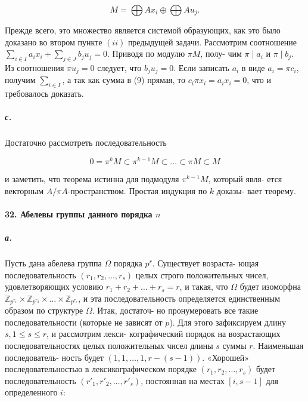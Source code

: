 {\begin{equation*}
M = \bigoplus Ax_{i} \oplus \bigoplus Au_{j}.
\end{equation*}




\noindent Прежде всего, это множество является системой образующих, как это
было доказано во втором пункте $(ii)$ предыдущей задачи. Рассмотрим
соотношение $\sum_{i \in I}a_{i}x_{i} + \sum_{j \in J}b_{j}u_{j} = 0$. Приводя по модулю $\pi M$, полу-
чим $\pi\;|\;a_{i}$ и $\pi\;|\;b_{j}$. Из соотношения $\pi u_{j} = 0$ следует, что $b_{j}u_{j} = 0$. Если
записать $a_{i}$ в виде $a_{i} = \pi c_{i}$, получим $\sum_{i \in I}$, а так как сумма
в (9) прямая, то $c_{i}\pi x_{i} = a_{i}x_{i} = 0$, что и требовалось доказать.

\subparagraph{с.} Достаточно рассмотреть последовательность

\begin{equation*}
0 = \pi^{k}M \subset \pi^{k-1}M \subset\dots\subset \pi M \subset M
\end{equation*}

\noindent и заметить, что теорема истинна для подмодуля $\pi^{k-1}M$, который явля-
ется векторным $A/\pi A$-пространством. Простая индукция по $k$ доказы-
вает теорему.

\paragraph{32. Абелевы группы данного порядка $n$}

\subparagraph{а.} Пусть дана абелева группа $\Omega$ порядка $p^{r}$. Существует возраста-
ющая последовательность $(r_{1},r_{2},\ldots,r_{s})$ целых строго положительных
чисел, удовлетворяющих условию $r_{1} + r_{2} +\dots+ r_{s} = r$, и такая, что
$\Omega$ будет изоморфна $\mathbb {Z}_{p^{r_{1}}} \times \mathbb {Z}_{p^{r_{2}}} \times \dots \times \mathbb {Z}_{p^{r_{s}}}$, и эта последовательность
определяется единственным образом по структуре $\Omega$. Итак, достаточ-
но пронумеровать все такие последовательности (которые не зависят
от $p$). Для этого зафиксируем длину $s, 1 \leqslant s \leqslant r$, и рассмотрим лекси-
кографический порядок на возрастающих последовательностях целых
положительных чисел длины $s$ суммы $r$. Наименьшая последователь-
ность будет $(1,1,\ldots,1,r - (s - 1))$. «Хорошей» последовательностью в
лексикографическом порядке $(r_{1},r_{2},\ldots,r_{s})$ будет последовательность
$(r'_{1},r'_{2},\ldots,r'_{s})$, постоянная на местах $[i,s - 1]$ для определенного $i$:

}
